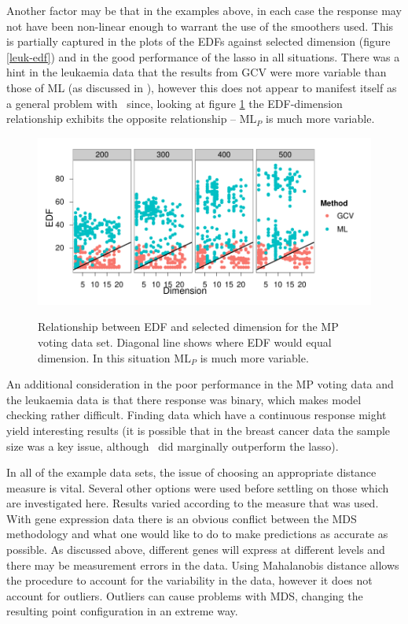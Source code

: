Another factor may be that in the examples above, in each case the response may not have been non-linear enough to warrant the use of the smoothers used. This is partially captured in the plots of the EDFs against selected dimension (figure \ref{leuk-edf}) and in the good performance of the lasso in all situations. There was a hint in the leukaemia data that the results from GCV were more variable than those of ML (as discussed in ), however this does not appear to manifest itself as a general problem with \mdsds\ since, looking at figure \ref{mps-edf-dim} the EDF-dimension relationship exhibits the opposite relationship -- $\text{ML}_P$ is much more variable.

\begin{figure}
\centering
\includegraphics[width=6in]{gds/figs/mps-dim-edf.pdf} \\
\caption{Relationship between EDF and selected dimension for the MP voting data set. Diagonal line shows where EDF would equal dimension. In this situation $\text{ML}_P$ is much more variable.}
\label{mps-edf-dim}
\end{figure}

An additional consideration in the poor performance in the MP voting data and the leukaemia data is that there response was binary, which makes model checking rather difficult. Finding data which have a continuous response might yield interesting results (it is possible that in the breast cancer data the sample size was a key issue, although \mdsds\ did marginally outperform the lasso).

In all of the example data sets, the issue of choosing an appropriate distance measure is vital. Several other options were used before settling on those which are investigated here. Results varied according to the measure that was used. With gene expression data there is an obvious conflict between the MDS methodology and what one would like to do to make predictions as accurate as possible. As discussed above, different genes will express at different levels and there may be measurement errors in the data. Using Mahalanobis distance allows the procedure to account for the variability in the data, however it does not account for outliers. Outliers can cause problems with MDS, changing the resulting point configuration in an extreme way.

